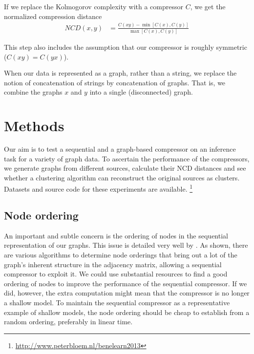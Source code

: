 \documentclass{article}
\begin{document}
If we replace the Kolmogorov complexity with a compressor $C$, we get the normalized compression distance
\begin{align*}
NCD(x, y) 
	&= \frac{C(xy) - \min \left[C(x), C(y)\right]}{\max \left [C(x), C(y) \right ]} 
\end{align*}
 
This step also includes the assumption that our compressor is roughly symmetric ($C(xy) = C(yx)$).

When our data is represented as a graph, rather than a string, we replace the notion of concatenation of strings by concatenation of graphs. That is, we combine the graphs $x$ and $y$ into a single (disconnected) graph.

\section*{Methods}

Our aim is to test a sequential and a graph-based compressor on an inference task for a variety of graph data. To ascertain the performance of the compressors, we generate graphs from different sources, calculate their NCD distances and see whether a clustering algorithm can reconstruct the original sources as clusters. Datasets and source code for these experiments are available. \footnote{\url{http://www.peterbloem.nl/benelearn2013}}

\subsection*{Node ordering}

An important and subtle concern is the ordering of nodes in the sequential representation of our graphs. This issue is detailed very well by . As shown, there are various algorithms to determine node orderings that bring out a lot of the graph's inherent structure in the adjacency matrix, allowing a sequential compressor to exploit it. We could use substantial resources to find a good ordering of nodes to improve the performance of the sequential compressor. If we did, however, the extra computation might mean that the compressor is no longer a shallow model. To maintain the sequential compressor as a representative example of shallow models, the node ordering should be cheap to establish from a random ordering, preferably in linear time. 
\end{document}
